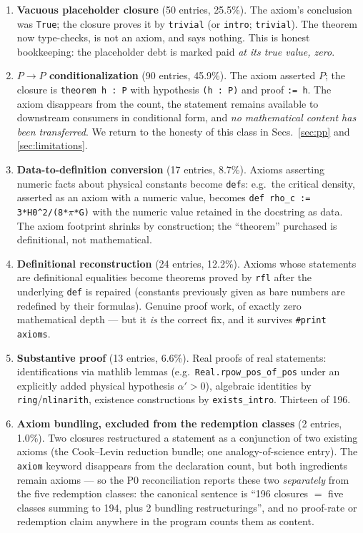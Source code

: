 \begin{enumerate}
\item[\ding{172}] \textbf{Vacuous placeholder closure} (50 entries,
25.5\%). The axiom's conclusion was \texttt{True}; the closure
proves it by \texttt{trivial} (or \texttt{intro}; \texttt{trivial}).
The theorem now type-checks, is not an axiom, and says nothing.
This is honest bookkeeping: the placeholder debt is marked paid
\emph{at its true value, zero}.
\item[\ding{173}] \textbf{\boldmath$P\!\to\!P$ conditionalization}
(90 entries, 45.9\%). The axiom asserted $P$; the closure is
\texttt{theorem h : P} with hypothesis \texttt{(h : P)} and proof
\texttt{:= h}. The axiom disappears from the count, the statement
remains available to downstream consumers in conditional form, and
\emph{no mathematical content has been transferred}. We return to
the honesty of this class in Secs.~\ref{sec:pp} and
\ref{sec:limitations}.
\item[\ding{174}] \textbf{Data-to-definition conversion} (17
entries, 8.7\%). Axioms asserting numeric facts about physical
constants become \texttt{def}s: e.g.\ the critical density, asserted
as an axiom with a numeric value, becomes
\texttt{def rho\_c := 3*H0\^{}2/(8*$\pi$*G)} with the numeric value
retained in the docstring as data. The axiom footprint shrinks by
construction; the ``theorem'' purchased is definitional, not
mathematical.
\item[\ding{175}] \textbf{Definitional reconstruction} (24 entries,
12.2\%). Axioms whose statements are definitional equalities become
theorems proved by \texttt{rfl} after the underlying \texttt{def}
is repaired (constants previously given as bare numbers are
redefined by their formulas). Genuine proof work, of exactly zero
mathematical depth --- but it \emph{is} the correct fix, and it
survives \texttt{\#print axioms}.
\item[\ding{176}] \textbf{Substantive proof} (13 entries, 6.6\%).
Real proofs of real statements: identifications via mathlib lemmas
(e.g.\ \texttt{Real.rpow\_pos\_of\_pos} under an explicitly added
physical hypothesis $\alpha' > 0$), algebraic identities by
\texttt{ring}/\texttt{nlinarith}, existence constructions by
\texttt{exists\_intro}. Thirteen of 196.
\item[\ding{177}] \textbf{Axiom bundling, excluded from the
redemption classes} (2 entries, 1.0\%). Two closures restructured a
statement as a conjunction of two existing axioms (the Cook--Levin
reduction bundle; one analogy-of-science entry). The \texttt{axiom}
keyword disappears from the declaration count, but both ingredients
remain axioms --- so the P0 reconciliation reports these two
\emph{separately} from the five redemption classes: the canonical
sentence is ``196 closures $=$ five classes summing to 194, plus 2
bundling restructurings'', and no proof-rate or redemption claim
anywhere in the program counts them as content.
\end{enumerate}

